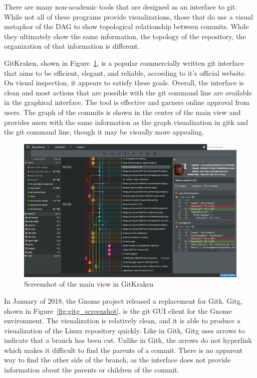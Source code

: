 There are many non-academic tools that are designed as an interface to
git.
While not all of these programs provide visualizations, those that
do use a visual metaphor of the DAG to show topological relationship
between commits.
While they ultimately show the same information, the topology of the
repository, the organization of that information is different.

GitKraken, shown in Figure~\ref{fig:gitkraken_main},  is a popular
commercially written git interface that aims to be efficient, elegant,
and reliable, according to it's official website.
On visual inspection, it appears to satisfy these goals.
Overall, the interface is clean and most actions that are possible with
the git command line are available in the graphical interface.
The tool is effective and garners online approval from users.
The graph of the commits is shown in the center of the main view and
provides users with the same information as the graph visualization in
gitk and the git command line, though it may be visually more appealing.

\begin{figure}[htpb]
  \centering
  \includegraphics[width=0.8\linewidth]{Figures/introduction/gitkraken_main.png}
  \caption{Screenshot of the main view in GitKraken}
  \label{fig:gitkraken_main}
\end{figure}

In January of 2018, the Gnome project released a replacement for Gitk.
Gitg, shown in Figure~\ref{fig:gitg_screenshot}, is the git GUI client
for the Gnome environment.
The visualization is relatively clean, and it is able to produce a
visualization of the Linux repository quickly.
Like in Gitk, Gitg uses arrows to indicate that a branch has been cut.
Unlike in Gitk, the arrows do not hyperlink which makes it difficult to
find the parents of a commit.
There is no apparent way to find the other side of the branch,
as the interface does not provide information about the parents or
children of the commit.


